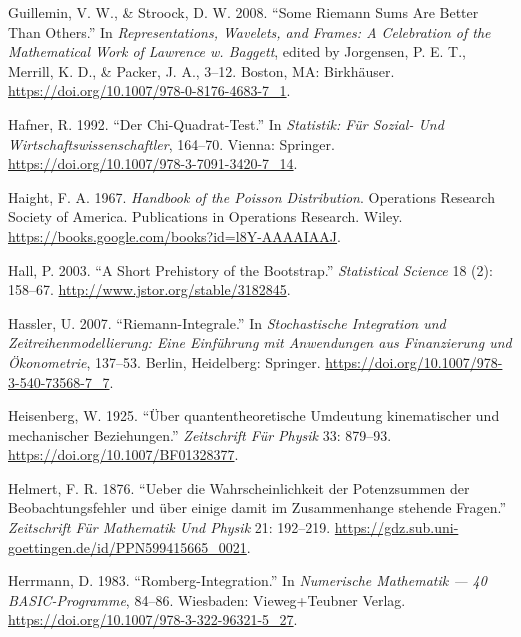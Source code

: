 \documentclass[
]{article}
\newlength{\cslhangindent}
\newlength{\cslentryspacingunit} %
\newenvironment{CSLReferences}[2] %
 {%
  \setlength{\parindent}{0pt}
  \ifodd #1
  \let\oldpar\par
  \def\par{\hangindent=\cslhangindent\oldpar}
  \fi
  \setlength{\parskip}{#2\cslentryspacingunit}
 }%
 {}
\begin{document}
\begin{CSLReferences}{1}{0}
\leavevmode{}%
Guillemin, V. W., \& Stroock, D. W. 2008. {``Some Riemann Sums Are
Better Than Others.''} In \emph{Representations, Wavelets, and Frames: A
Celebration of the Mathematical Work of Lawrence w. Baggett}, edited by
Jorgensen, P. E. T., Merrill, K. D., \& Packer, J. A., 3--12. Boston,
MA: Birkhäuser. \url{https://doi.org/10.1007/978-0-8176-4683-7_1}.

\leavevmode{}%
Hafner, R. 1992. {``Der Chi-Quadrat-Test.''} In \emph{Statistik: F{ü}r
Sozial- Und Wirtschaftswissenschaftler}, 164--70. Vienna: Springer.
\url{https://doi.org/10.1007/978-3-7091-3420-7_14}.

\leavevmode{}%
Haight, F. A. 1967. \emph{Handbook of the Poisson Distribution}.
Operations Research Society of America. Publications in Operations
Research. Wiley. \url{https://books.google.com/books?id=l8Y-AAAAIAAJ}.

\leavevmode{}%
Hall, P. 2003. {``A Short Prehistory of the Bootstrap.''}
\emph{Statistical Science} 18 (2): 158--67.
\url{http://www.jstor.org/stable/3182845}.

\leavevmode{}%
Hassler, U. 2007. {``Riemann-Integrale.''} In \emph{{Stochastische
Integration und Zeitreihenmodellierung: Eine Einführung mit Anwendungen
aus Finanzierung und Ökonometrie}}, 137--53. Berlin, Heidelberg:
Springer. \url{https://doi.org/10.1007/978-3-540-73568-7_7}.

\leavevmode{}%
Heisenberg, W. 1925. {``{Über quantentheoretische Umdeutung
kinematischer und mechanischer Beziehungen}.''} \emph{{Zeitschrift Für
Physik}} 33: 879--93. \url{https://doi.org/10.1007/BF01328377}.

\leavevmode{}%
Helmert, F. R. 1876. {``{Ueber die Wahrscheinlichkeit der Potenzsummen
der Beobachtungsfehler und über einige damit im Zusammenhange stehende
Fragen}.''} \emph{{Zeitschrift Für Mathematik Und Physik}} 21: 192--219.
\url{https://gdz.sub.uni-goettingen.de/id/PPN599415665_0021}.

\leavevmode{}%
Herrmann, D. 1983. {``Romberg-Integration.''} In \emph{Numerische
Mathematik --- 40 BASIC-Programme}, 84--86. Wiesbaden: Vieweg+Teubner
Verlag. \url{https://doi.org/10.1007/978-3-322-96321-5_27}.


\end{CSLReferences}
\end{document}
